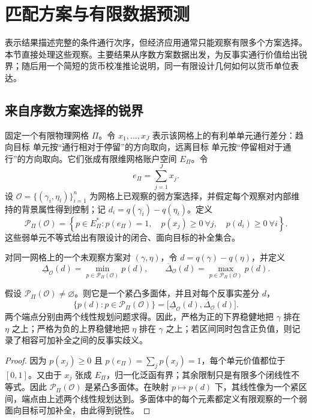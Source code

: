\section{匹配方案与有限数据预测}\label{sec:implications}

表示结果描述完整的条件通行次序，但经济应用通常只能观察有限多个方案选择。本节直接处理这些观察。主要结果从序数方案数据出发，为反事实通行价值给出锐界；随后用一个简短的货币校准推论说明，同一有限设计几何如何以货币单位表达。

\subsection{来自序数方案选择的锐界}\label{sec:finiteprediction}

固定一个有限物理网格 $\Pi$。令 $x_1,\ldots,x_J$ 表示该网格上的有利单单元通行差分：趋向目标 单元按“通行相对于停留”的方向取向，远离目标 单元按“停留相对于通行”的方向取向。它们张成有限维网格账户空间 $E_\Pi$。令
\[
 e_\Pi=\sum_{j=1}^J x_j.
\]
设 $\mathcal O=\{(\gamma_i,\eta_i)\}_{i=1}^n$ 为网格上已观察的弱方案选择，并假定每个观察对内部维持的背景属性得到控制；记 $d_i=q(\gamma_i)-q(\eta_i)$。定义
\[
 \mathcal P_\Pi(\mathcal O)
 =\left\{
 p\in E_\Pi^*:
 p(e_\Pi)=1,\quad
 p(x_j)\ge0\ \forall j,\quad
 p(d_i)\ge0\ \forall i
 \right\}.
\]
这些弱单元不等式给出有限设计的闭合、面向目标的补全集合。

对同一网格上的一个未观察方案对 $(\gamma,\eta)$，令 $d=q(\gamma)-q(\eta)$，并定义
\[
 \underline\Delta_{\mathcal O}(d)
 =\min_{p\in\mathcal P_\Pi(\mathcal O)}p(d),
 \qquad
 \overline\Delta_{\mathcal O}(d)
 =\max_{p\in\mathcal P_\Pi(\mathcal O)}p(d).
\]

\begin{theorem}[有限设计反事实通行锐界]\label{thm:finite-bounds}
假设 $\mathcal P_\Pi(\mathcal O)\neq\varnothing$。则它是一个紧凸多面体，并且对每个反事实差分 $d$，
\[
 \{p(d):p\in\mathcal P_\Pi(\mathcal O)\}
 =\bigl[\underline\Delta_{\mathcal O}(d),\overline\Delta_{\mathcal O}(d)\bigr].
\]
两个端点分别由两个线性规划问题求得。因此，严格为正的下界稳健地把 $\gamma$ 排在 $\eta$ 之上；严格为负的上界稳健地把 $\eta$ 排在 $\gamma$ 之上；若区间同时包含正负值，则记录了相容可加补全之间的反事实歧义。
\end{theorem}

\begin{proof}
因为 $p(x_j)\ge0$ 且 $p(e_\Pi)=\sum_jp(x_j)=1$，每个单元价值都位于 $[0,1]$。又由于 $x_j$ 张成 $E_\Pi$，归一化泛函有界；其余限制只是有限多个闭线性不等式。因此 $\mathcal P_\Pi(\mathcal O)$ 是紧凸多面体。在映射 $p\mapsto p(d)$ 下，其线性像为一个紧区间，端点由上述两个线性规划达到。多面体中的每个元素都定义有限观察的一个弱面向目标可加补全，由此得到锐性。
\end{proof}

